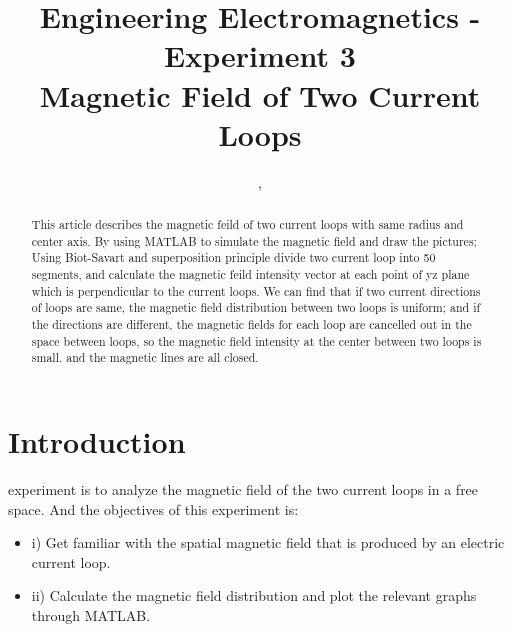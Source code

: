 \documentclass[10pt, journal, final]{IEEEtran}
\begin{document}
\title{Engineering Electromagnetics - Experiment 3\\ Magnetic Field of Two Current Loops}
\author{,
    \\
}

\maketitle

\begin{abstract}
    This article describes the magnetic feild of two current loops with same radius and center axis.
    By using MATLAB to simulate the magnetic field and draw the pictures; Using Biot-Savart and superposition principle
    divide two current loop into 50 segments, and calculate the magnetic feild intensity vector at each point of
    yz plane which is perpendicular to the current loops. We can find that if two current directions of loops are same,
    the magnetic field distribution between two loops is uniform; and if the directions are different, 
    the magnetic fields for each loop are cancelled out in the space between loops, so the magnetic field intensity at
    the center between two loops is small. and the magnetic lines are all closed.

    
\end{abstract}

\section{
  Introduction
 }
\label{sec:Intro}

 experiment is to analyze the magnetic field of
the two current loops in a free space. And the objectives of this experiment is:
\begin{itemize}
    \item i) Get familiar with the spatial magnetic field that is produced by an electric current loop.
    \item ii) Calculate the magnetic field distribution and plot the relevant graphs through MATLAB.
\end{itemize}
\end{document}
